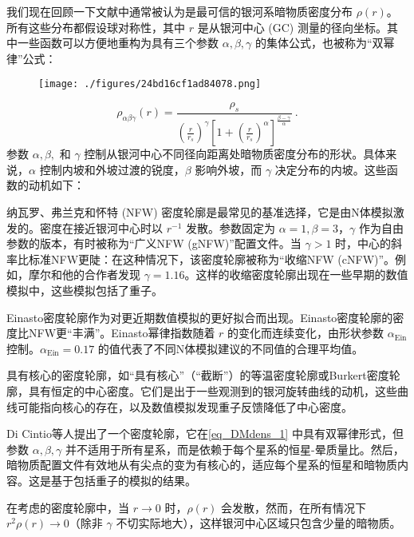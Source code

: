 
 
我们现在回顾一下文献中通常被认为是最可信的银河系暗物质密度分布 \(\rho(r)\)。所有这些分布都假设球对称性，其中 \(r\) 是从银河中心 (GC) 测量的径向坐标。其中一些函数可以方便地重构为具有三个参数 \(\alpha, \beta, \gamma\) 的集体公式，也被称为“双幂律”公式：

\begin{figure}[ht]
\centering
\texttt{[image: ./figures/24bd16cf1ad84078.png]}
\caption{} \label{fig_DMdens_1}
\end{figure}
\begin{equation}\label{eq_DMdens_1}
\rho_{\alpha\beta\gamma}(r) =  \frac{\rho_s}{ \left(\frac{r}{r_s}\right)^\gamma \left[1 + \left(\frac{r}{r_s}\right)^\alpha\right]^{\frac{\beta-\gamma}{\alpha}}  } ~.
\end{equation}
参数 \(\alpha, \beta,\) 和 \(\gamma\) 控制从银河中心不同径向距离处暗物质密度分布的形状。具体来说，\(\alpha\) 控制内坡和外坡过渡的锐度，\(\beta\) 影响外坡，而 \(\gamma\) 决定分布的内坡。这些函数的动机如下：

纳瓦罗、弗兰克和怀特 (NFW) 密度轮廓是最常见的基准选择，它是由N体模拟激发的。密度在接近银河中心时以 \(r^{-1}\) 发散。参数固定为 \(\alpha = 1, \beta = 3\)，\(\gamma\) 作为自由参数的版本，有时被称为“广义NFW (gNFW)”配置文件。当 \(\gamma > 1\) 时，中心的斜率比标准NFW更陡：在这种情况下，该密度轮廓被称为“收缩NFW (cNFW)”。例如，摩尔和他的合作者发现 \(\gamma = 1.16\)。这样的收缩密度轮廓出现在一些早期的数值模拟中，这些模拟包括了重子。

Einasto密度轮廓作为对更近期数值模拟的更好拟合而出现。Einasto密度轮廓的密度比NFW更“丰满”。Einasto幂律指数随着 \(r\) 的变化而连续变化，由形状参数 \(\alpha_{\text{Ein}}\) 控制。\(\alpha_{\text{Ein}} = 0.17\) 的值代表了不同N体模拟建议的不同值的合理平均值。

具有核心的密度轮廓，如“具有核心”（“截断”）的等温密度轮廓或Burkert密度轮廓，具有恒定的中心密度。它们是出于一些观测到的银河旋转曲线的动机，这些曲线可能指向核心的存在，以及数值模拟发现重子反馈降低了中心密度。

Di Cintio等人提出了一个密度轮廓，它在\autoref{eq_DMdens_1} 中具有双幂律形式，但参数 \(\alpha, \beta, \gamma\) 并不适用于所有星系，而是依赖于每个星系的恒星-晕质量比。然后，暗物质配置文件有效地从有尖点的变为有核心的，适应每个星系的恒星和暗物质内容。这是基于包括重子的模拟的结果。

在考虑的密度轮廓中，当 \(r \to 0\) 时，\(\rho(r)\) 会发散，然而，在所有情况下 \(r^2\rho(r) \to 0\)（除非 \(\gamma\) 不切实际地大），这样银河中心区域只包含少量的暗物质。

